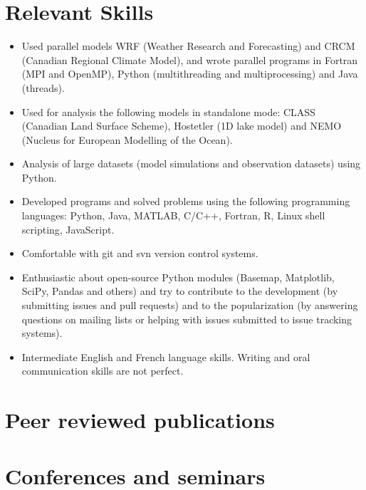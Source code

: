 \documentclass[12pt,a4paper,sans]{moderncv}
\newcommand{\vertspace}{1em}
\begin{document}
\section{Relevant Skills}
\vspace{\vertspace}
\begin{itemize}

  \item Used parallel models WRF (Weather Research and Forecasting) and CRCM
  (Canadian Regional Climate Model), and wrote parallel programs in Fortran
  (MPI and OpenMP), Python (multithreading and multiprocessing) and Java (threads).

  \item Used for analysis the following models in standalone mode: CLASS (Canadian Land Surface Scheme), Hostetler (1D lake model) and NEMO (Nucleus for European Modelling of the Ocean).

  \item Analysis of large datasets (model simulations and observation datasets) using Python.

  \item Developed programs and solved problems using the following programming languages: Python, Java, MATLAB, C/C++, Fortran, R, Linux shell scripting, JavaScript.

  \item Comfortable with git and svn version control systems.

  \item Enthusiastic about open-source Python modules (Basemap, Matplotlib,
  SciPy, Pandas and others) and try to contribute to the development (by
  submitting issues and pull requests) and to the popularization (by answering
  questions on mailing lists or helping with issues submitted to
  issue tracking systems).

  \item Intermediate English and French language skills. Writing and oral communication skills are not perfect.

\end{itemize}


\section*{Peer reviewed publications}



\section*{Conferences and seminars}

\end{document}
